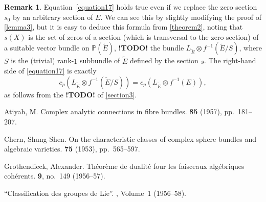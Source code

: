 \documentclass{article}
\theoremstyle{plain}
\theoremstyle{definition}
\newtheorem*{remark}{Remark}
\newcommand{\todo}{\textbf{ !TODO! }}
\newcommand{\oldpage}[1]{\marginpar{\footnotesize$\Big\vert$ \textit{p.~#1}}}
\begin{document}
\begin{remark}
  Equation~\cref{equation17} holds true even if we replace the zero section $s_0$ by an arbitrary section of $E$.
  We can see this by slightly modifying the proof of \cref{lemma3}, but it is easy to deduce this formula from
\oldpage{154}
  \cref{theorem2}, noting that $s(X)$ is the set of zeros of a section (which is transversal to the zero section) of a suitable vector bundle on $\mathbb{P}(\widetilde{E})$, \todo the bundle $L_{\widetilde{E}}\otimes f^{-1}(\widetilde{E}/S)$, where $S$ is the (trivial) rank-$1$ subbundle of $\widetilde{E}$ defined by the section $s$.
  The right-hand side of \cref{equation17} is exactly
  \[
    c_p(L_{\widetilde{E}}\otimes f^{-1}(\widetilde{E}/S)) = c_p(L_{\widetilde{E}}\otimes f^{-1}(E)),
  \]
  as follows from the \todo of \cref{section3}.
\end{remark}



\nocite{*}


\begin{thebibliography}{4}

  {\sc Atiyah, M.}
  \newblock Complex analytic connections in fibre bundles.
   {\bf 85} (1957), pp.~181--207.

  {\sc Chern, Shung-Shen.}
  \newblock On the characteristic classes of complex sphere bundles and algebraic varieties.
   {\bf 75} (1953), pp.~565--597.

  {\sc Grothendieck, Alexander.}
  \newblock Th\'{e}or\`{e}me de dualit\'{e} four les faisceaux alg\'{e}briques coh\'{e}rents.
   {\bf 9}, no.~149 (1956--57).

  ``Classification des groupes de Lie''.
  , {Volume~1} (1956--58).

\end{thebibliography}
\end{document}
